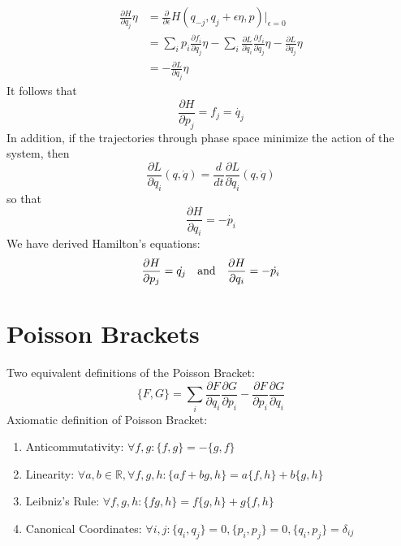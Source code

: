 \documentclass[11pt]{article}
\theoremstyle{definition}
\begin{document}
\begin{equation}
\begin{split}
\frac{\partial H}{\partial q_j} \eta & =\frac{\partial}{\partial \epsilon} H \left( q_{-j} , q_j + \epsilon \eta , p \right) \rvert_{\epsilon = 0} \\
& = \sum_i p_i \frac{\partial f_i}{\partial q_j} \eta
- \sum_i \frac{\partial L}{\partial \dot{q}_i} \frac{\partial f_i}{\partial q_j} \eta
- \frac{\partial L}{\partial q_j} \eta \\
& = - \frac{\partial L}{\partial q_j} \eta
\end{split}
\end{equation}
It follows that
\begin{equation}
\frac{\partial H}{\partial p_j} = f_j = \dot{q_j}
\end{equation}
In addition, if the trajectories through phase space minimize the action of the system, then
\begin{equation}
\frac{\partial L}{\partial q_i} \left( q , \dot{q} \right) = \frac{d}{dt} \frac{\partial L}{\partial \dot{q}_i} \left( q , \dot{q} \right)
\end{equation}
so that
\begin{equation}
\frac{\partial H}{\partial q_i} = - \dot{p_i}
\end{equation}
We have derived Hamilton's equations:
\begin{align}
\frac{\partial H}{\partial p_j} = \dot{q_j} &&
\textup{and} &&
\frac{\partial H}{\partial q_i} = - \dot{p_i}
\end{align}
\section{Poisson Brackets}
Two equivalent definitions of the Poisson Bracket:
\begin{equation}
\{ F , G \} = \sum_i \frac{\partial F}{\partial q_i} \frac{\partial G}{\partial p_i} - \frac{\partial F}{\partial p_i} \frac{\partial G}{\partial q_i}
\end{equation}
Axiomatic definition of Poisson Bracket:
\begin{enumerate}
\item Anticommutativity: $\forall f,g : \{f,g\} = - \{g,f\}$
\item Linearity: $\forall a,b \in \mathbb{R},\forall f,g,h : \{ af + bg , h \} = a\{f,h \} + b\{ g, h \}$
\item Leibniz's Rule: $\forall f,g,h: \{ fg ,h \} = f\{g,h \} + g\{f,h \}$
\item Canonical Coordinates: $\forall i,j: \{q_i ,q_j \} = 0, \{ p_i , p_j \} = 0, \{q_i , p_j \} = \delta_{ij}$
\end{enumerate}
\end{document}
